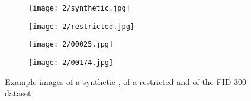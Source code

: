 \documentclass[draft,final]{vutinfth} %
\begin{document}
\begin{figure}[h]
  \centering
  \begin{subfigure}[b]{0.24\columnwidth}
    \centering
    \texttt{[image: 2/synthetic.jpg]}
    \label{fig:rw:synthetic}
  \end{subfigure}
  \begin{subfigure}[b]{0.24\columnwidth}
    \centering
    \texttt{[image: 2/restricted.jpg]}
    \label{fig:rw:restricted}
  \end{subfigure}
  \begin{subfigure}[b]{0.24\columnwidth}
    \centering
    \texttt{[image: 2/00025.jpg]}
    \label{fig:rw:highFID}
  \end{subfigure}
  \begin{subfigure}[b]{0.24\columnwidth}
    \centering
    \texttt{[image: 2/00174.jpg]}
    \label{fig:rw:lowFID}
  \end{subfigure}
  \caption{Example images of a synthetic \cite{alizadeh2017automatic}, of a restricted \cite{li2014retrieval} and of the FID-300 \cite{kortylewski2014unsupervised} dataset}
  \label{fig:rw:database}
\end{figure}
\end{document}
